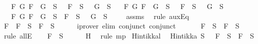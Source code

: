 \begin{isabellebody}
\ \ {\isasymand}\ {\isacharparenleft}{\isasymforall}F\ G{\isachardot}\ \isactrlbold {\isasymnot}{\isacharparenleft}F\ \isactrlbold {\isasymand}\ G{\isacharparenright}\ {\isasymin}\ S\ {\isasymlongrightarrow}\ \isactrlbold {\isasymnot}\ F\ {\isasymin}\ S\ {\isasymor}\ \isactrlbold {\isasymnot}\ G\ {\isasymin}\ S{\isacharparenright}\isanewline
\ \ {\isasymand}\ {\isacharparenleft}{\isasymforall}F\ G{\isachardot}\ \isactrlbold {\isasymnot}{\isacharparenleft}F\ \isactrlbold {\isasymor}\ G{\isacharparenright}\ {\isasymin}\ S\ {\isasymlongrightarrow}\ \isactrlbold {\isasymnot}\ F\ {\isasymin}\ S\ {\isasymand}\ \isactrlbold {\isasymnot}\ G\ {\isasymin}\ S{\isacharparenright}\isanewline
\ \ {\isasymand}\ {\isacharparenleft}{\isasymforall}F\ G{\isachardot}\ \isactrlbold {\isasymnot}{\isacharparenleft}F\ \isactrlbold {\isasymrightarrow}\ G{\isacharparenright}\ {\isasymin}\ S\ {\isasymlongrightarrow}\ F\ {\isasymin}\ S\ {\isasymand}\ \isactrlbold {\isasymnot}\ G\ {\isasymin}\ S{\isacharparenright}{\isachardoublequoteclose}\isanewline
\ \ \ \isamarkupfalse%
\ assms\ \isamarkupfalse%
\ {\isacharparenleft}rule\ auxEq{\isacharparenright}\isanewline
\ \ \isamarkupfalse%
\ \isamarkupfalse%
\ {\isachardoublequoteopen}{\isasymforall}F{\isachardot}\ \isactrlbold {\isasymnot}\ {\isacharparenleft}\isactrlbold {\isasymnot}F{\isacharparenright}\ {\isasymin}\ S\ {\isasymlongrightarrow}\ F\ {\isasymin}\ S{\isachardoublequoteclose}\isanewline
\ \ \ \ \isamarkupfalse%
\ {\isacharparenleft}iprover\ elim{\isacharcolon}\ conjunct{}\ conjunct{}{\isacharparenright}\isanewline
\ \ \isamarkupfalse%
\ \isamarkupfalse%
\ {\isachardoublequoteopen}\isactrlbold {\isasymnot}\ {\isacharparenleft}\isactrlbold {\isasymnot}F{\isacharparenright}\ {\isasymin}\ S\ {\isasymlongrightarrow}\ F\ {\isasymin}\ S{\isachardoublequoteclose}\isanewline
\ \ \ \ \isamarkupfalse%
\ {\isacharparenleft}rule\ allE{\isacharparenright}\isanewline
\ \ \isamarkupfalse%
\ {\isachardoublequoteopen}F\ {\isasymin}\ S{\isachardoublequoteclose}\isanewline
\ \ \ \ \isamarkupfalse%
\ H\ \isamarkupfalse%
\ {\isacharparenleft}rule\ mp{\isacharparenright}\isanewline
{}\isamarkupfalse%
%
\endisatagproof
{\isafoldproof}%
%
\isadelimproof
\isanewline
%
\endisadelimproof
\isanewline
{}\isamarkupfalse%
\ Hintikka{\isacharunderscore}l{}{\isacharcolon}\ \isanewline
\ {\isachardoublequoteopen}Hintikka\ S\ {\isasymLongrightarrow}\ \isactrlbold {\isasymnot}\ {\isacharparenleft}\isactrlbold {\isasymnot}F{\isacharparenright}\ {\isasymin}\ S\ {\isasymlongrightarrow}\ F\ {\isasymin}\ S{\isachardoublequoteclose}\isanewline

\end{isabellebody}

